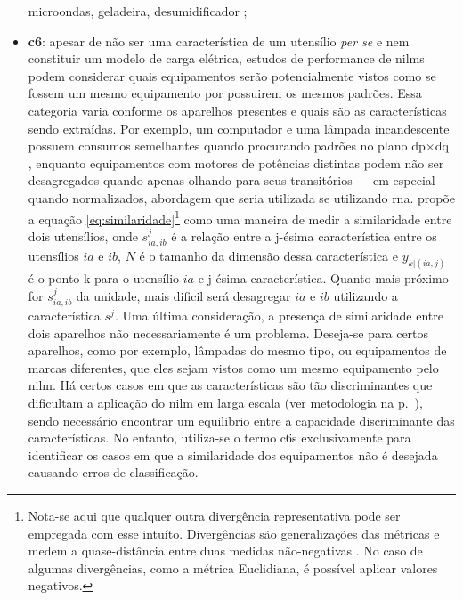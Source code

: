 \begin{itemize}
microondas, geladeira, desumidificador
\cite{nilm_liang_pt2_2010_40};
\item \textbf{\Gls{c6}}: apesar de não ser
uma característica de um utensílio \emph{per se} e nem constituir um
modelo de carga elétrica, estudos de performance de \glspl{nilm} podem
considerar quais equipamentos serão potencialmente vistos como se
fossem um mesmo equipamento por possuirem os mesmos padrões. Essa categoria
varia conforme os aparelhos presentes e quais são as
características sendo extraídas. Por exemplo, um computador e uma
lâmpada incandescente possuem consumos semelhantes quando procurando
padrões no plano \acs{dp}$\times$\acs{dq}
\cite{nilm_laughman_continuous_variables_2003_9}, enquanto
equipamentos com motores de potências distintas podem não ser
desagregados quando apenas olhando para seus transitórios --- em
especial quando normalizados, abordagem que seria utilizada se
utilizando \acrfull{rna}. \cite{nilm_liang_pt1_2010_34} propõe a
equação \ref{eq:similaridade}\footnote{Nota-se aqui que qualquer 
outra divergência representativa pode ser empregada com esse 
intuíto. Divergências são generalizações das métricas e medem a
quase-distância entre duas medidas não-negativas
\cite[cap. 2]{cichocki2009nonnegative}. No caso de algumas
divergências, como a métrica Euclidiana, é possível aplicar valores
negativos.} como uma maneira de medir a similaridade entre dois
utensílios, onde $s^j_{ia,ib}$ é a relação entre a j-ésima
característica entre os utensílios $ia$ e $ib$, $N$ é o tamanho da
dimensão dessa característica e $y_{k|(ia,j)}$ é o ponto k para o
utensílio $ia$ e j-ésima característica. Quanto mais próximo for
$s^j_{ia,ib}$ da unidade, mais dificil será desagregar $ia$ e $ib$
utilizando a característica $s^j$. Uma última consideração, a presença
de similaridade entre dois aparelhos não necessariamente é um
problema. Deseja-se para certos aparelhos, como por exemplo, lâmpadas
do mesmo tipo, ou equipamentos de marcas diferentes, que eles sejam
vistos como um mesmo equipamento pelo \gls{nilm}. Há certos casos em
que as características são tão discriminantes que dificultam a
aplicação do \gls{nilm} em larga escala (ver metodologia na
p.~\pageref{nilm:emi}), sendo necessário encontrar um equilibrio entre
a capacidade discriminante das características. No entanto, utiliza-se
o termo \glspl{c6} exclusivamente para identificar os casos em que a
similaridade dos equipamentos não é desejada causando erros de
classificação.
\end{itemize}

